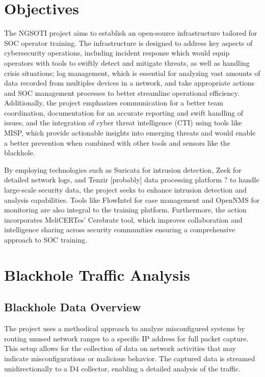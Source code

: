 \chapter{Objectives}
The NGSOTI project aims to establish an open-source infrastructure tailored for SOC operator training. The infrastructure is designed to address key aspects of cybersecurity operations, including incident response {\color{red} which would equip operators with tools to swiftly detect and mitigate threats, as well as handling crisis situations}; log management, {\color{red} which is essential for analyzing vast amounts of data recorded from multiples devices in a network, and take appropriate actions} and SOC management processes {\color{red} to better streamline operational efficiency}. Additionally, the project emphasizes communication {\color{red} for a better team coordination}, documentation {\color{red} for an accurate reporting and swift handling of issues}, and the integration of cyber threat intelligence (CTI) using tools like MISP, {\color{red} which provide actionable insights into emerging threats and would enable a better prevention when combined with other tools and sensors like the blackhole.}

By employing technologies such as Suricata {\color{red} for intrusion detection}, Zeek {\color{red} for detailed network logs}, and Tenzir  {\color{red} [probably] data processing platform ? to handle large-scale security data}, the project seeks to enhance intrusion detection and analysis capabilities. Tools like FlowIntel for case management and OpenNMS for monitoring are also integral to the training platform. Furthermore, the action incorporates MeliCERTes' Cerebrate tool, which improves collaboration and intelligence sharing across security communities ensuring a comprehensive approach to SOC training.




\chapter{Blackhole Traffic Analysis}

{\color{red} \section{Blackhole Data Overview}}

The project uses a methodical approach to analyze misconfigured systems by routing unused network ranges to a specific IP address for full packet capture. This setup allows for the collection of data on network activities that may indicate misconfigurations or malicious behavior. The captured data is streamed unidirectionally to a D4 collector, enabling a detailed analysis of the traffic.

